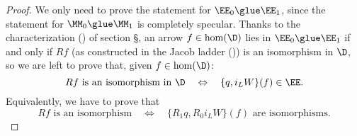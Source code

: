 \begin{proof}
We only need to prove the statement for $\EE_0\glue\EE_1$, since the statement for $\MM_0\glue\MM_1$ is completely specular. Thanks to the characterization () of section \S{}, an arrow $f\in\hom(\D)$ lies in $\EE_0\glue \EE_1$ if and only if $Rf$ (as constructed in the Jacob ladder ()) is an isomorphism in $\D$, so we are left to prove that, given $f\in\hom(\D)$:
\[
\text{$Rf$ is an isomorphism in $\D$}\quad\Leftrightarrow\quad 
\text{$\{q, i_LW\}(f)\in \EE$}.
\]
Equivalently, we have to prove that
\[
\text{$Rf$ is an isomorphism}\quad\Leftrightarrow\quad 
\text{$\{R_1q, R_0i_LW\}(f)$ are isomorphisms}.
\]

%

\end{proof}
